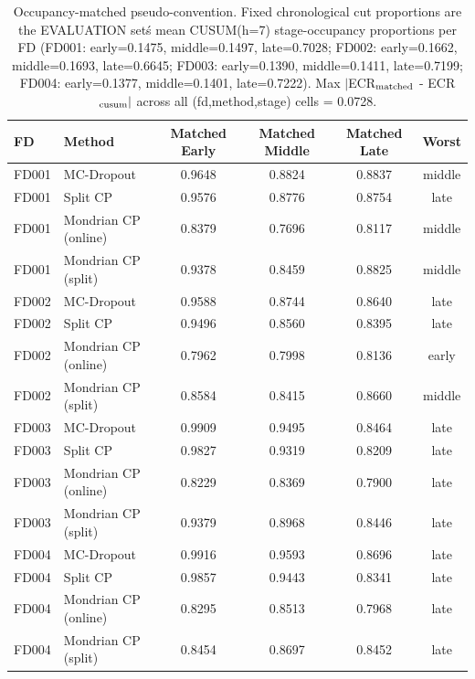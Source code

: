 \begin{table}[t]
\caption{Occupancy-matched pseudo-convention. Fixed chronological cut proportions are the EVALUATION set\'s mean CUSUM(h=7) stage-occupancy proportions per FD (FD001: early=0.1475, middle=0.1497, late=0.7028; FD002: early=0.1662, middle=0.1693, late=0.6645; FD003: early=0.1390, middle=0.1411, late=0.7199; FD004: early=0.1377, middle=0.1401, late=0.7222). Max $|$ECR$_{\rm matched}$ - ECR$_{\rm cusum}|$ across all (fd,method,stage) cells = 0.0728.}
\label{tab:matched-v4}
\centering
\small
\begin{tabular}{llcccc}
\toprule
FD & Method & Matched Early & Matched Middle & Matched Late & Worst \\
\midrule
FD001 & MC-Dropout & 0.9648 & 0.8824 & 0.8837 & middle \\
FD001 & Split CP & 0.9576 & 0.8776 & 0.8754 & late \\
FD001 & Mondrian CP (online) & 0.8379 & 0.7696 & 0.8117 & middle \\
FD001 & Mondrian CP (split) & 0.9378 & 0.8459 & 0.8825 & middle \\
FD002 & MC-Dropout & 0.9588 & 0.8744 & 0.8640 & late \\
FD002 & Split CP & 0.9496 & 0.8560 & 0.8395 & late \\
FD002 & Mondrian CP (online) & 0.7962 & 0.7998 & 0.8136 & early \\
FD002 & Mondrian CP (split) & 0.8584 & 0.8415 & 0.8660 & middle \\
FD003 & MC-Dropout & 0.9909 & 0.9495 & 0.8464 & late \\
FD003 & Split CP & 0.9827 & 0.9319 & 0.8209 & late \\
FD003 & Mondrian CP (online) & 0.8229 & 0.8369 & 0.7900 & late \\
FD003 & Mondrian CP (split) & 0.9379 & 0.8968 & 0.8446 & late \\
FD004 & MC-Dropout & 0.9916 & 0.9593 & 0.8696 & late \\
FD004 & Split CP & 0.9857 & 0.9443 & 0.8341 & late \\
FD004 & Mondrian CP (online) & 0.8295 & 0.8513 & 0.7968 & late \\
FD004 & Mondrian CP (split) & 0.8454 & 0.8697 & 0.8452 & late \\
\bottomrule
\end{tabular}
\end{table}
